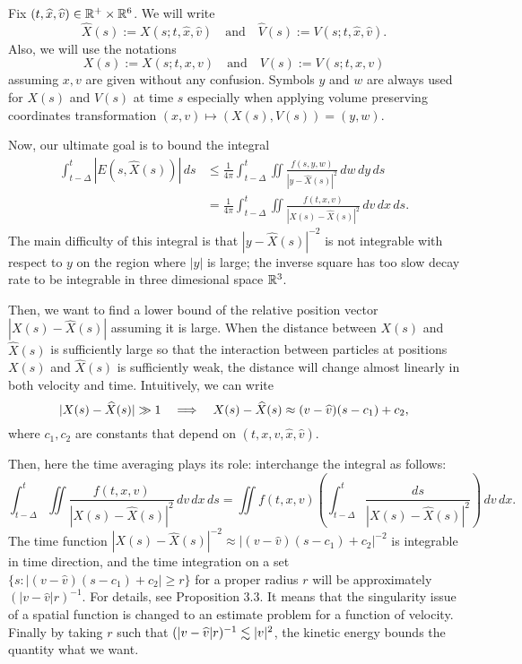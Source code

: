 \documentclass[11pt]{amsart}
\begin{document}
\begin{notn*}
Fix $(t,\widehat x,\widehat v)\in\mathbb{R}^+\times\mathbb{R}^6$.
We will write
\[\hat X(s):=X(s;t,\hat x,\hat v)\quad\text{and}\quad\hat V(s):=V(s;t,\hat x,\hat v).\]
Also, we will use the notations
\[X(s):=X(s;t,x,v)\quad\text{and}\quad V(s):=V(s;t,x,v)\]
assuming $x,v$ are given without any confusion.
Symbols $y$ and $w$ are always used for $X(s)$ and $V(s)$ at time $s$ especially when applying volume preserving coordinates transformation $(x,v)\mapsto(X(s),V(s))=(y,w)$.
\end{notn*}

Now, our ultimate goal is to bound the integral
\begin{align*}
\int_{t-\Delta}^t|E(s,\hat X(s))|\,ds
&\le\frac1{4\pi}\int_{t-\Delta}^t\iint\frac{f(s,y,w)}{|y-\hat X(s)|^2}\,dw\,dy\,ds\\
&=\frac1{4\pi}\int_{t-\Delta}^t\iint\frac{f(t,x,v)}{|X(s)-\hat X(s)|^2}\,dv\,dx\,ds.
\end{align*}
The main difficulty of this integral is that $|y-\hat X(s)|^{-2}$ is not integrable with respect to $y$ on the region where $|y|$ is large; the inverse square has too slow decay rate to be integrable in three dimesional space $\mathbb{R}^3$.

Then, we want to find a lower bound of the relative position vector $|X(s)-\hat X(s)|$ assuming it is large.
When the distance between $X(s)$ and $\hat X(s)$ is sufficiently large so that the interaction between particles at positions $X(s)$ and $\hat X(s)$ is sufficiently weak, the distance will change almost linearly in both velocity and time.
Intuitively, we can write
\[|X(s)-\hat X(s)|\gg1\impl X(s)-\hat X(s)\approx (v-\hat v)(s-c_1)+c_2,\]
where $c_1,c_2$ are constants that depend on $(t,x,v,\hat x,\hat v)$.

Then, here the time averaging plays its role: interchange the integral as follows:
\[\int_{t-\Delta}^t\iint\frac{f(t,x,v)}{|X(s)-\hat X(s)|^2}\,dv\,dx\,ds=\iint f(t,x,v)\left(\int_{t-\Delta}^t\frac{ds}{|X(s)-\hat X(s)|^2}\right)\,dv\,dx.\]
The time function $|X(s)-\hat X(s)|^{-2}\approx|(v-\hat v)(s-c_1)+c_2|^{-2}$ is integrable in time direction, and the time integration on a set $\{s:|(v-\hat v)(s-c_1)+c_2|\ge r\}$ for a proper radius $r$ will be approximately $(|v-\hat v|r)^{-1}$.
For details, see Proposition 3.3.
It means that the singularity issue of a spatial function is changed to an estimate problem for a function of velocity.
Finally by taking $r$ such that $(|v-\widehat v|r)^{-1}\lesssim|v|^2$, the kinetic energy bounds the quantity what we want.
\end{document}
